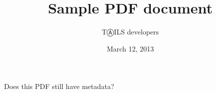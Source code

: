 \documentclass[12pt]{article}
\title{Sample PDF document}
\author{TⒶILS developers}
\date{March 12, 2013}
\begin{document}
\maketitle
Does this PDF still have metadata?
\end{document}

